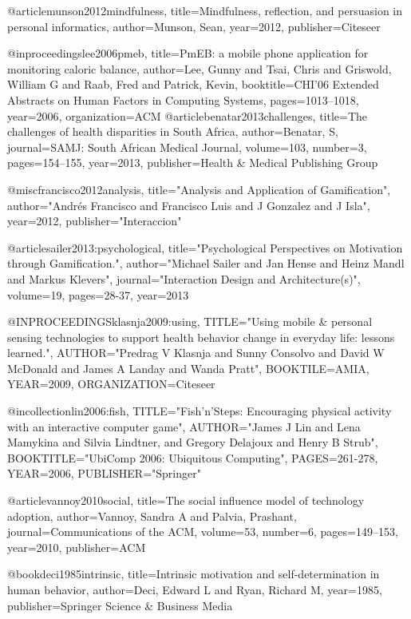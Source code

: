 @article{munson2012mindfulness,
  title={Mindfulness, reflection, and persuasion in personal informatics},
  author={Munson, Sean},
  year={2012},
  publisher={Citeseer}
}

@inproceedings{lee2006pmeb,
  title={PmEB: a mobile phone application for monitoring caloric balance},
  author={Lee, Gunny and Tsai, Chris and Griswold, William G and Raab, Fred and Patrick, Kevin},
  booktitle={CHI'06 Extended Abstracts on Human Factors in Computing Systems},
  pages={1013--1018},
  year={2006},
  organization={ACM}
}
@article{benatar2013challenges,
  title={The challenges of health disparities in South Africa},
  author={Benatar, S},
  journal={SAMJ: South African Medical Journal},
  volume={103},
  number={3},
  pages={154--155},
  year={2013},
  publisher={Health \& Medical Publishing Group}
}

@misc{francisco2012analysis,
  title="Analysis and Application of Gamification",
  author="Andr{\'e}s Francisco and Francisco Luis and J Gonzalez and J Isla",
  year={2012},
  publisher="Interaccion"
}

@article{sailer2013:psychological,
  title="Psychological Perspectives on Motivation through Gamification.",
  author="Michael Sailer and Jan Hense and Heinz Mandl and Markus Klevers",
  journal="Interaction Design and Architecture(s)",
  volume={19},
  pages={28-37},
  year={2013}
}

@INPROCEEDINGS{klasnja2009:using,
  TITLE="Using mobile \& personal sensing technologies to support health behavior change in everyday life: lessons learned.",
  AUTHOR="Predrag V Klasnja and Sunny Consolvo and David W McDonald and James A Landay and Wanda Pratt",
  BOOKTILE={AMIA},
  YEAR={2009},
  ORGANIZATION={Citeseer}
}

@incollection{lin2006:fish,
  TITLE="Fish'n'Steps: Encouraging physical activity with an interactive computer game",
  AUTHOR="James J Lin and Lena Mamykina and Silvia Lindtner,  and Gregory Delajoux and Henry B Strub",
  BOOKTITLE="UbiComp 2006: Ubiquitous Computing",
  PAGES={261-278},
  YEAR={2006},
  PUBLISHER="Springer"
}

@article{vannoy2010social,
  title={The social influence model of technology adoption},
  author={Vannoy, Sandra A and Palvia, Prashant},
  journal={Communications of the ACM},
  volume={53},
  number={6},
  pages={149--153},
  year={2010},
  publisher={ACM}
}

@book{deci1985intrinsic,
  title={Intrinsic motivation and self-determination in human behavior},
  author={Deci, Edward L and Ryan, Richard M},
  year={1985},
  publisher={Springer Science \& Business Media}
}

